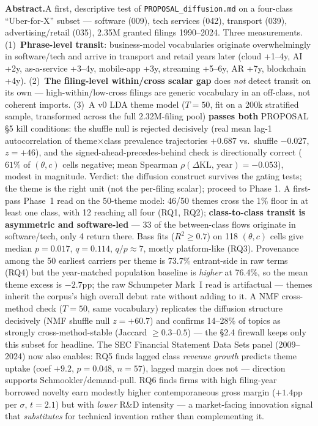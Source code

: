\documentclass[11pt]{report}
\begin{document}
\noindent\textbf{Abstract.}\quad A first, descriptive test of
\texttt{PROPOSAL\_diffusion.md} on a four-class ``Uber-for-X'' subset ---
software (009), tech services (042), transport (039), advertising/retail (035),
2.35M granted filings 1990--2024. Three measurements. (1)~\textbf{Phrase-level
transit}: business-model vocabularies originate overwhelmingly in software/tech
and arrive in transport and retail years later (cloud +1--4y, AI +2y,
as-a-service +3--4y, mobile-app +3y, streaming +5--6y, AR +7y, blockchain +4y).
(2)~\textbf{The filing-level within/cross scalar gap} does \emph{not} detect
transit on its own --- high-within/low-cross filings are generic vocabulary in
an off-class, not coherent imports. (3)~A v0 LDA theme model ($T=50$, fit on a
200k stratified sample, transformed across the full 2.32M-filing pool)
\textbf{passes both} PROPOSAL §5 kill conditions: the shuffle null is rejected
decisively (real mean lag-1 autocorrelation of theme$\times$class prevalence
trajectories $+0.687$ vs.\ shuffle $-0.027$, $z=+46$), and the
signed-ahead-precedes-behind check is directionally correct ($61\%$ of
$(\theta, c)$ cells negative; mean Spearman
$\rho(\Delta\mathrm{KL},\,\text{year}) = -0.053$), modest in magnitude.
Verdict: the diffusion construct survives the gating tests; the theme is the
right unit (not the per-filing scalar); proceed to Phase 1. A first-pass
Phase~1 read on the 50-theme model: 46/50 themes cross the 1\% floor in at
least one class, with 12 reaching all four (RQ1, RQ2);
\textbf{class-to-class transit is asymmetric and software-led} --- 33 of the
between-class flows originate in software/tech, only 4 return there. Bass
fits ($R^2 \geq 0.7$) on 118 $(\theta, c)$ cells give median $p = 0.017$,
$q = 0.114$, $q/p \approx 7$, mostly platform-like (RQ3). Provenance among
the 50 earliest carriers per theme is 73.7\% entrant-side in raw terms (RQ4)
but the year-matched population baseline is \emph{higher} at 76.4\%, so the
mean theme excess is $-2.7$pp; the raw Schumpeter Mark~I read is artifactual
--- themes inherit the corpus's high overall debut rate without adding to it.
A NMF cross-method check ($T=50$, same vocabulary) replicates the diffusion
structure decisively (NMF shuffle null $z=+60.7$) and confirms 14--28\% of
topics as strongly cross-method-stable (Jaccard $\geq 0.3$--$0.5$) --- the
§2.4 firewall keeps only this subset for headline. The SEC Financial Statement
Data Sets panel (2009--2024) now also enables: RQ5 finds lagged class
\emph{revenue growth} predicts theme uptake (coef $+9.2$, $p=0.048$, $n=57$),
lagged margin does not --- direction supports Schmookler/demand-pull. RQ6
finds firms with high filing-year borrowed novelty earn modestly higher
contemporaneous gross margin ($+1.4$pp per $\sigma$, $t=2.1$) but with
\emph{lower} R\&D intensity --- a market-facing innovation signal that
\emph{substitutes} for technical invention rather than complementing it.
\end{document}
